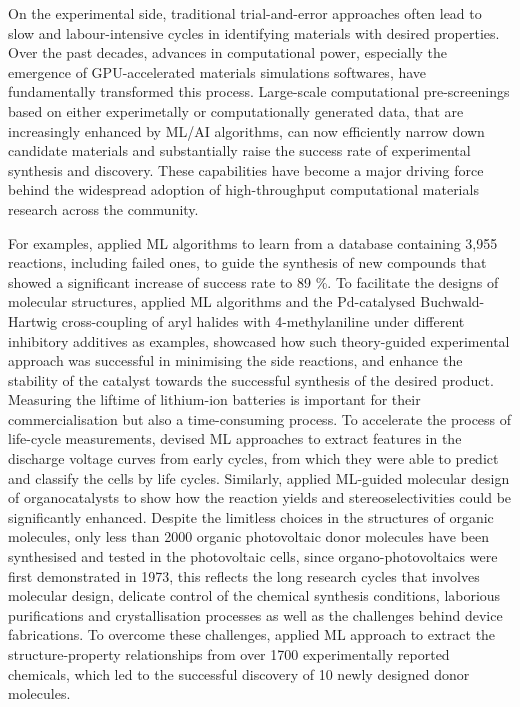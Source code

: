 On the experimental side, traditional trial-and-error approaches often lead to slow and labour-intensive cycles in identifying materials with desired properties. Over the past decades, advances in computational power, especially the emergence of GPU-accelerated materials simulations softwares, have fundamentally transformed this process. Large-scale computational pre-screenings based on either experimetally or computationally generated data, that are increasingly enhanced by ML/AI algorithms, can now efficiently narrow down candidate materials and substantially raise the success rate of experimental synthesis and discovery. These capabilities have become a major driving force behind the widespread adoption of high-throughput computational materials research across the community. 

For examples, \citet{raccuglia2016machine} applied ML algorithms to learn from a database containing 3,955 reactions, including failed ones, to guide the synthesis of new compounds that showed a significant increase of success rate to 89 \%. To facilitate the designs of molecular structures, \citet{ahneman2018predicting} applied ML algorithms and the Pd-catalysed Buchwald-Hartwig cross-coupling of aryl halides with 4-methylaniline under different inhibitory additives as examples, showcased how such theory-guided experimental approach was successful in minimising the side reactions, and enhance the stability of the catalyst towards the successful synthesis of the desired product.  Measuring the liftime of lithium-ion batteries is important for their commercialisation but also a time-consuming process. To accelerate the process of life-cycle measurements, \citet{severson2019data} devised ML approaches to extract features in the discharge voltage curves from early cycles, from which they were able to predict and classify the cells by life cycles. Similarly, \citet{zahrt2019prediction} applied ML-guided molecular design of organocatalysts to show how the reaction yields and stereoselectivities could be significantly enhanced. Despite the limitless choices in the structures of organic molecules, only less than 2000 organic photovoltaic donor molecules have been synthesised and tested in the photovoltaic cells, since organo-photovoltaics were first demonstrated in 1973,\cite{ghosh1973rectification} this reflects the long research cycles that involves molecular design, delicate control of the chemical synthesis conditions, laborious purifications and crystallisation processes as well as the challenges behind device fabrications. To overcome these challenges, \citet{sun2019machine} applied ML approach to extract the structure-property relationships from over 1700 experimentally reported chemicals, which led to the successful discovery of 10 newly designed donor molecules. 

